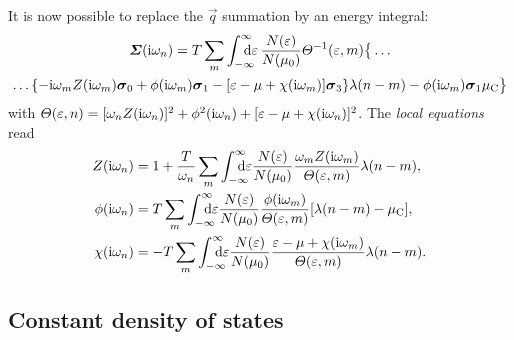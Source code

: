 It is now possible to replace the $\vec q$ summation by an energy integral:
%
\begin{multline} \label{local self-energy}
    \vec \Sigma(\I \omega_n)
    = T \sum_m \int \from{-\infty} \till \infty \D \epsilon \,
    \frac{N(\epsilon)}{N(\mu_0)}
    \Theta^{-1}(\epsilon, m) \big \{ \dots
        \\
        \dots \{
            - \I \omega_m Z(\I \omega_m) \vec \sigma_0
            + \phi(\I \omega_m) \vec \sigma_1
            - [\epsilon - \mu + \chi(\I \omega_m)] \vec \sigma_3
            \}
        \lambda(n - m) - \phi(\I \omega_m) \vec \sigma_1 \mu \sub C
    \big \}
\end{multline}
%
with $\varTheta(\varepsilon, n) = [\omega_n Z(\mathrm i \omega_n)]^2 + \phi^2(\mathrm i \omega_n) +
[\varepsilon - \mu + \chi(\mathrm i \omega_n)]^2$. The \emph{local 
equations} read
%
\begin{subequations} \label{local Eliashberg equations}
    \begin{align}
        Z(\I \omega_n) &= 1 + \frac T {\omega_n} \sum_m
        \int \from{-\infty} \till \infty \D \epsilon
        \frac{N(\epsilon)}{N(\mu_0)}
        \frac{\omega_m Z(\I \omega_m)}{\Theta(\epsilon, m)}
        \lambda(n - m),
        \\
        \phi(\I \omega_n) &= T \sum_m
        \int \from{-\infty} \till \infty \D \epsilon
        \frac{N(\epsilon)}{N(\mu_0)}
        \frac{\phi(\I \omega_m)}{\Theta(\epsilon, m)}
        [\lambda(n - m) - \mu \sub C],
        \\
        \chi(\I \omega_n) &= -T \sum_m
        \int \from{-\infty} \till \infty \D \epsilon
        \frac{N(\epsilon)}{N(\mu_0)}
        \frac{\epsilon - \mu + \chi(\I \omega_m)}{\Theta(\epsilon, m)}
        \lambda(n - m).
    \end{align}
\end{subequations}

\subsection{Constant density of states}

